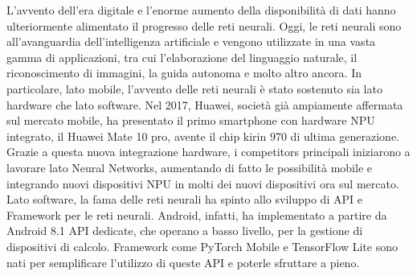 L'avvento dell'era digitale e l'enorme aumento della disponibilità di dati hanno ulteriormente alimentato il progresso delle reti neurali. Oggi, le reti
neurali sono all'avanguardia dell'intelligenza artificiale e vengono utilizzate in una vasta gamma di applicazioni, tra cui l'elaborazione del linguaggio
naturale, il riconoscimento di immagini, la guida autonoma e molto altro ancora. 
In particolare, lato mobile, l’avvento delle reti neurali è stato sostenuto sia lato hardware che lato software.
Nel 2017, Huawei, società già ampiamente affermata sul mercato mobile, ha presentato il primo smartphone con hardware NPU integrato, il Huawei Mate 10 pro,
avente il chip kirin 970 di ultima generazione. Grazie a questa nuova integrazione hardware, i competitors principali iniziarono a lavorare lato Neural
Networks, aumentando di fatto le possibilità mobile e integrando nuovi dispositivi NPU in molti dei nuovi dispositivi ora sul mercato.
Lato software, la fama delle reti neurali ha spinto allo sviluppo di API e Framework per le reti neurali. Android, infatti, ha implementato a partire da
Android 8.1 API dedicate, che operano a basso livello, per la gestione di dispositivi di calcolo.
Framework come PyTorch Mobile e TensorFlow Lite sono nati per semplificare l’utilizzo di queste API e poterle sfruttare a pieno.

